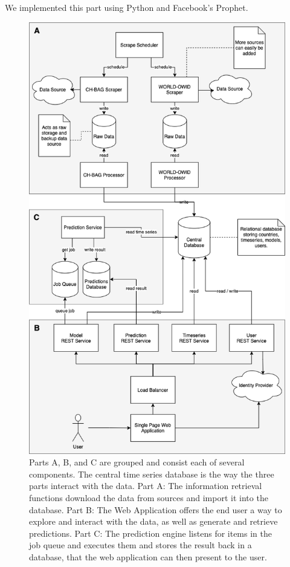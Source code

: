 We implemented this part using Python and Facebook's Prophet.

\begin{figure}
\centerline{\includegraphics[scale=.5]{figs/system-diagram.png}}
\caption{Parts A, B, and C are grouped and consist each of several components. The central time series database is the way the three parts interact with the data. Part A: The information retrieval functions download the data from sources and import it into the database. Part B: The Web Application offers the end user a way to explore and interact with the data, as well as generate and retrieve predictions. Part C: The prediction engine listens for items in the job queue and executes them and stores the result back in a database, that the web application can then present to the user.}
\label{fig:system}
\end{figure}
